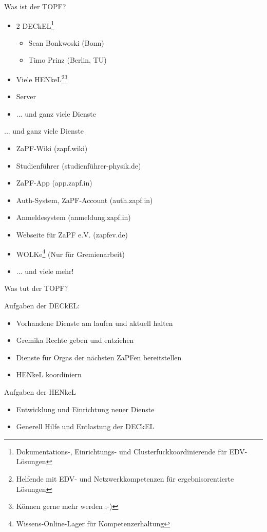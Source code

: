 \documentclass[compress, aspectratio=169]{beamer}
\begin{document}
\thispagestyle{empty}
\begin{frame}{Was ist der TOPF?}
  \begin{itemize}
    \item 2 DECkEL\footnote{Dokumentations-, Einrichtungs- und Clusterfuckkoordinierende für EDV-Lösungen} 
    \begin{itemize}
      \item Sean Bonkwoski (Bonn)
      \item Timo Prinz (Berlin, TU)
    \end{itemize}
    \item Viele HENkeL\footnote{Helfende mit EDV- und Netzwerkkompetenzen für ergebnisorentierte Lösungen}\footnote{Können gerne mehr werden ;-)}
    \item Server
    \item ... und ganz viele Dienste
  \end{itemize}
\end{frame}

\thispagestyle{empty}
\begin{frame}{... und ganz viele Dienste}
  \begin{itemize}
    \item ZaPF-Wiki (zapf.wiki)
    \item Studienführer (studienführer-physik.de)
    \item ZaPF-App (app.zapf.in)
    \item Auth-System, \glqq{}ZaPF-Account\grqq{} (auth.zapf.in)
    \item Anmeldesystem (anmeldung.zapf.in)
    \item Webseite für ZaPF e.V. (zapfev.de)
    \item WOLKe\footnote{Wissens-Online-Lager für Kompetenzerhaltung} (Nur für Gremienarbeit)
    \item ... und viele mehr!
  \end{itemize}
\end{frame}

\pagestyle{empty}
\begin{frame}{Was tut der TOPF?}
\begin{block}{Aufgaben der DECkEL:}
\begin{itemize}
\item Vorhandene Dienste am laufen und aktuell halten
\item Gremika Rechte geben und entziehen
\item Dienste für Orgas der nächsten ZaPFen bereitstellen
\item HENkeL koordiniern
\end{itemize}
\end{block}
\pause
\begin{block}{Aufgaben der HENkeL}
  \begin{itemize}
    \item Entwicklung und Einrichtung neuer Dienste
    \item Generell Hilfe und Entlastung der DECkEL
  \end{itemize}
\end{block}
\end{frame}
\end{document}
